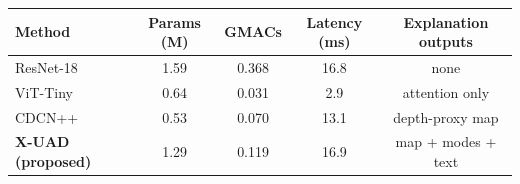 \begin{tabular}{lcccc}
\toprule
Method & Params (M) & GMACs & Latency (ms) & Explanation outputs \\
\midrule
ResNet-18~\cite{he2016resnet} & 1.59 & 0.368 & 16.8 & none \\
ViT-Tiny~\cite{dosovitskiy2021vit} & 0.64 & 0.031 & 2.9 & attention only \\
CDCN++~\cite{yu2020cdcn} & 0.53 & 0.070 & 13.1 & depth-proxy map \\
\textbf{X-UAD (proposed)} & 1.29 & 0.119 & 16.9 & map + modes + text \\
\bottomrule
\end{tabular}
